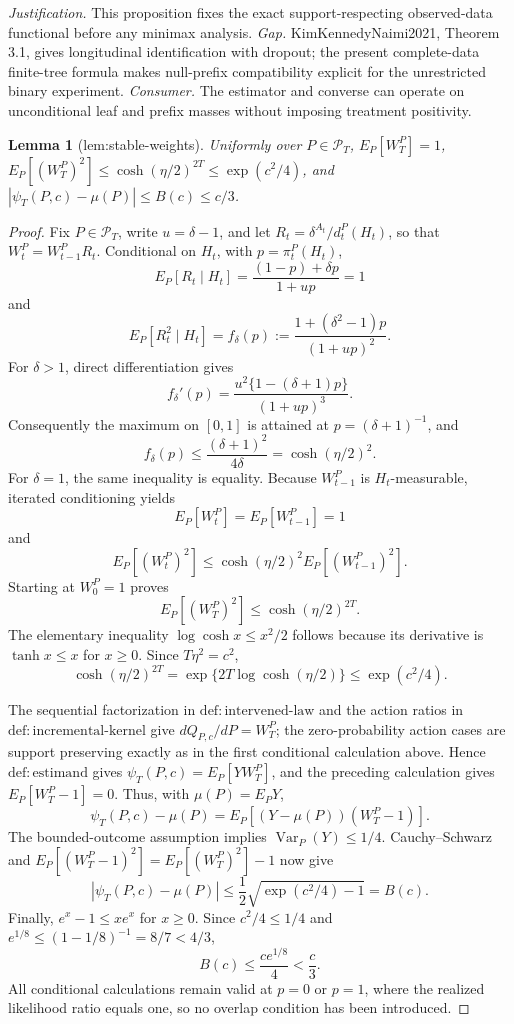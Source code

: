 \documentclass{article}
\newtheorem{lemma}{Lemma}
\begin{document}
\par\smallskip\noindent \textit{Justification.} This proposition fixes the exact support-respecting observed-data functional before any minimax analysis. \textit{Gap.} KimKennedyNaimi2021, Theorem 3.1, gives longitudinal identification with dropout; the present complete-data finite-tree formula makes null-prefix compatibility explicit for the unrestricted binary experiment. \textit{Consumer.} The estimator and converse can operate on unconditional leaf and prefix masses without imposing treatment positivity.

\begin{lemma}[lem:stable-weights]\label{lem:stable-weights}
Uniformly over \(P\in\mathcal P_T\), \(E_P[W_T^P]=1\), \(E_P[(W_T^P)^2]\leq\cosh(\eta/2)^{2T}\leq\exp(c^2/4)\), and \(|\psi_T(P,c)-\mu(P)|\leq B(c)\leq c/3\).
\end{lemma}
\begin{proof}
Fix \(P\in\mathcal P_T\), write \(u=\delta-1\), and let \(R_t=\delta^{A_t}/d_t^P(H_t)\), so that \(W_t^P=W_{t-1}^P R_t\).  Conditional on \(H_t\), with \(p=\pi_t^P(H_t)\),
\[
 E_P[R_t\mid H_t]=\frac{(1-p)+\delta p}{1+up}=1
\]
and
\[
 E_P[R_t^2\mid H_t]
 =f_\delta(p):=\frac{1+(\delta^2-1)p}{(1+up)^2}.
\]
For \(\delta>1\), direct differentiation gives
\[
 f_\delta'(p)=
 \frac{u^2\{1-(\delta+1)p\}}{(1+up)^3}.
\]
Consequently the maximum on \([0,1]\) is attained at \(p=(\delta+1)^{-1}\), and
\[
 f_\delta(p)\leq \frac{(\delta+1)^2}{4\delta}
 =\cosh(\eta/2)^2.
\]
For \(\delta=1\), the same inequality is equality.  Because \(W_{t-1}^P\) is \(H_t\)-measurable, iterated conditioning yields
\[
 E_P[W_t^P]=E_P[W_{t-1}^P]=1
\]
and
\[
 E_P[(W_t^P)^2]
 \leq \cosh(\eta/2)^2 E_P[(W_{t-1}^P)^2].
\]
Starting at \(W_0^P=1\) proves
\[
 E_P[(W_T^P)^2]\leq\cosh(\eta/2)^{2T}.
\]
The elementary inequality \(\log\cosh x\leq x^2/2\) follows because its derivative is \(\tanh x\leq x\) for \(x\geq0\).  Since \(T\eta^2=c^2\),
\[
 \cosh(\eta/2)^{2T}
 =\exp\{2T\log\cosh(\eta/2)\}
 \leq\exp(c^2/4).
\]

The sequential factorization in \(\mathrm{def:intervened\text{-}law}\) and the action ratios in \(\mathrm{def:incremental\text{-}kernel}\) give \(dQ_{P,c}/dP=W_T^P\); the zero-probability action cases are support preserving exactly as in the first conditional calculation above.  Hence \(\mathrm{def:estimand}\) gives \(\psi_T(P,c)=E_P[YW_T^P]\), and the preceding calculation gives \(E_P[W_T^P-1]=0\).  Thus, with \(\mu(P)=E_PY\),
\[
 \psi_T(P,c)-\mu(P)
 =E_P[(Y-\mu(P))(W_T^P-1)].
\]
The bounded-outcome assumption implies \(\operatorname{Var}_P(Y)\leq1/4\).  Cauchy--Schwarz and \(E_P[(W_T^P-1)^2]=E_P[(W_T^P)^2]-1\) now give
\[
 |\psi_T(P,c)-\mu(P)|
 \leq\frac12\sqrt{\exp(c^2/4)-1}=B(c).
\]
Finally, \(e^x-1\leq xe^x\) for \(x\geq0\).  Since \(c^2/4\leq1/4\) and \(e^{1/8}\leq(1-1/8)^{-1}=8/7<4/3\),
\[
 B(c)\leq \frac{c e^{1/8}}4<\frac c3.
\]
All conditional calculations remain valid at \(p=0\) or \(p=1\), where the realized likelihood ratio equals one, so no overlap condition has been introduced.
\end{proof}
\end{document}
